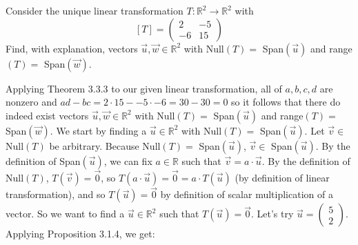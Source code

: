 \documentclass[12pt]{article}
\newenvironment{problem}[2][Problem]
{
	\begin{trivlist} 
		\item[\hskip \labelsep {\bfseries #1 #2:}]
	}
{
	\end{trivlist}
	}
\newenvironment{solution}[1][Solution]
{
	\begin{trivlist} 
		\item[\hskip \labelsep {\itshape #1:}]
	}
	{
	\end{trivlist}
}
\begin{document}
\begin{problem}{1}
Consider the unique linear transformation $T:\mathbb{R}^2 \to \mathbb{R}^2$ with
\[
[T]=\begin{pmatrix}2 &-5\\-6 & 15 \end{pmatrix}
\]
Find, with explanation, vectors $\vec{u},\vec{w} \in \mathbb{R}^2$ with Null$(T)=$ Span$(\vec{u})$ and range$(T)=$ Span$(\vec{w})$.
%
%
\begin{solution}
 Applying Theorem 3.3.3 to our given linear transformation, all of $a,b,c,d$ are nonzero and $ad-bc=2\cdot 15 - -5 \cdot -6 = 30 - 30=0$ so it follows that there do indeed exist vectors $\vec{u},\vec{w} \in \mathbb{R}^2$ with Null$(T)=$ Span$(\vec{u})$ and range$(T)=$ Span$(\vec{w})$. 
We start by finding a $\vec{u} \in \mathbb{R}^2$ with Null$(T)=$ Span$(\vec{u})$. Let $\vec{v} \in$ Null$(T)$ be arbitrary. Because Null$(T)=$ Span$(\vec{u})$, $\vec{v} \in$ Span$(\vec{u})$. By the definition of Span$(\vec{u})$, we can fix $a\in \mathbb{R}$ such that $\vec{v}=a\cdot \vec{u}$.  By the definition of Null$(T)$, $T(\vec{v})=\vec{0}$, so  $T(a\cdot \vec{u})=\vec{0} =a\cdot T(\vec{u})$ (by definition of linear transformation), and so $T(\vec{u}) = \vec{0}$ by definition of scalar multiplication of a vector. So we want to find a $\vec{u} \in \mathbb{R}^2$ such that $T(\vec{u})=\vec{0}$. Let's try $\vec{u}=\begin{pmatrix} 5\\2 \end{pmatrix}$. Applying Proposition 3.1.4, we get:

\end{solution}
\end{problem}
\end{document}
